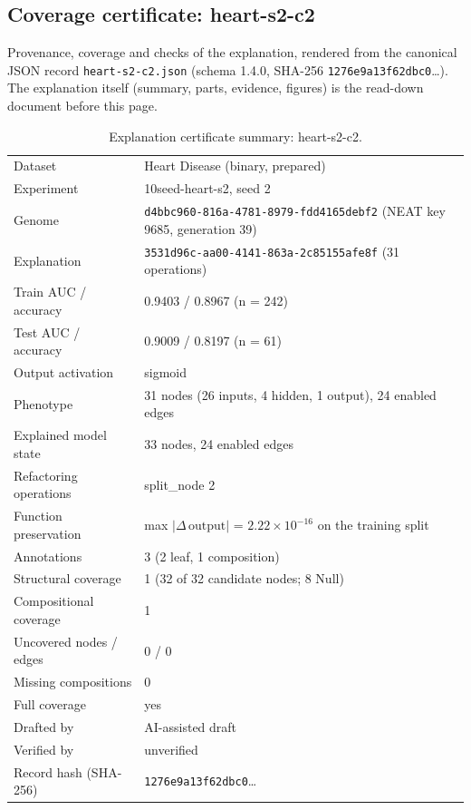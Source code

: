 \providecommand{\explaneatcertdir}[1]{}
\begin{drafted}
\section{Coverage certificate: heart-s2-c2}\label{app:heart-s2-c2:sec}
Provenance, coverage and checks of the explanation, rendered from the canonical JSON record \texttt{heart-s2-c2.json} (schema 1.4.0, SHA-256 \texttt{1276e9a13f62dbc0}\ldots). The explanation itself (summary, parts, evidence, figures) is the read-down document before this page.

\begin{table}[htbp]
\centering\small
\begin{tabularx}{\linewidth}{@{}lX@{}}
\toprule
Dataset & Heart Disease (binary, prepared) \\
Experiment & 10seed-heart-s2, seed 2 \\
Genome & \texttt{d4bbc960-816a-4781-8979-fdd4165debf2} (NEAT key 9685, generation 39) \\
Explanation & \texttt{3531d96c-aa00-4141-863a-2c85155afe8f} (31 operations) \\
Train AUC / accuracy & 0.9403 / 0.8967 (n = 242) \\
Test AUC / accuracy & 0.9009 / 0.8197 (n = 61) \\
Output activation & sigmoid \\
Phenotype & 31 nodes (26 inputs, 4 hidden, 1 output), 24 enabled edges \\
Explained model state & 33 nodes, 24 enabled edges \\
Refactoring operations & split\_\allowbreak{}node 2 \\
Function preservation & max $|\Delta\,\mathrm{output}|$ = $2.22\times 10^{-16}$ on the training split \\
Annotations & 3 (2 leaf, 1 composition) \\
Structural coverage & 1 (32 of 32 candidate nodes; 8 Null) \\
Compositional coverage & 1 \\
Uncovered nodes / edges & 0 / 0 \\
Missing compositions & 0 \\
Full coverage & yes \\
Drafted by & AI-assisted draft \\
Verified by & unverified \\
Record hash (SHA-256) & \texttt{1276e9a13f62dbc0}\ldots \\
\bottomrule
\end{tabularx}
\caption{Explanation certificate summary: heart-s2-c2.}
\label{app:heart-s2-c2:summary}
\end{table}

\end{drafted}
